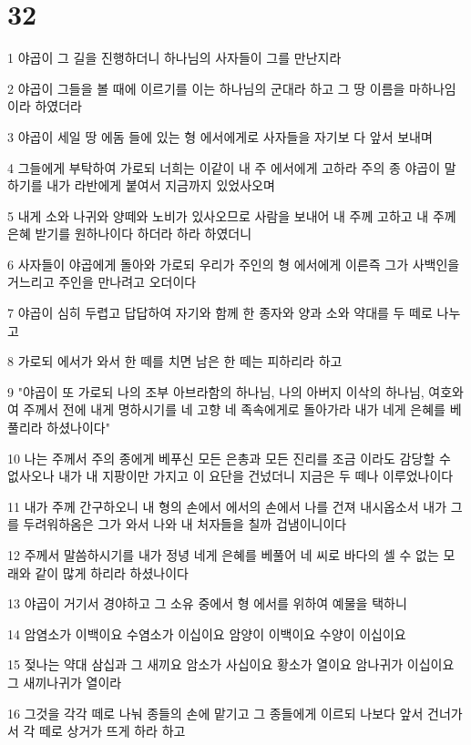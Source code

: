 \chapter{32}

\par 1 야곱이 그 길을 진행하더니 하나님의 사자들이 그를 만난지라
\par 2 야곱이 그들을 볼 때에 이르기를 이는 하나님의 군대라 하고 그 땅 이름을 마하나임이라 하였더라
\par 3 야곱이 세일 땅 에돔 들에 있는 형 에서에게로 사자들을 자기보 다 앞서 보내며
\par 4 그들에게 부탁하여 가로되 너희는 이같이 내 주 에서에게 고하라 주의 종 야곱이 말하기를 내가 라반에게 붙여서 지금까지 있었사오며
\par 5 내게 소와 나귀와 양떼와 노비가 있사오므로 사람을 보내어 내 주께 고하고 내 주께 은혜 받기를 원하나이다 하더라 하라 하였더니
\par 6 사자들이 야곱에게 돌아와 가로되 우리가 주인의 형 에서에게 이른즉 그가 사백인을 거느리고 주인을 만나려고 오더이다
\par 7 야곱이 심히 두렵고 답답하여 자기와 함께 한 종자와 양과 소와 약대를 두 떼로 나누고
\par 8 가로되 에서가 와서 한 떼를 치면 남은 한 떼는 피하리라 하고
\par 9 "야곱이 또 가로되 나의 조부 아브라함의 하나님, 나의 아버지 이삭의 하나님, 여호와여 주께서 전에 내게 명하시기를 네 고향 네 족속에게로 돌아가라 내가 네게 은혜를 베풀리라 하셨나이다"
\par 10 나는 주께서 주의 종에게 베푸신 모든 은총과 모든 진리를 조금 이라도 감당할 수 없사오나 내가 내 지팡이만 가지고 이 요단을 건넜더니 지금은 두 떼나 이루었나이다
\par 11 내가 주께 간구하오니 내 형의 손에서 에서의 손에서 나를 건져 내시옵소서 내가 그를 두려워하옴은 그가 와서 나와 내 처자들을 칠까 겁냄이니이다
\par 12 주께서 말씀하시기를 내가 정녕 네게 은혜를 베풀어 네 씨로 바다의 셀 수 없는 모래와 같이 많게 하리라 하셨나이다
\par 13 야곱이 거기서 경야하고 그 소유 중에서 형 에서를 위하여 예물을 택하니
\par 14 암염소가 이백이요 수염소가 이십이요 암양이 이백이요 수양이 이십이요
\par 15 젖나는 약대 삼십과 그 새끼요 암소가 사십이요 황소가 열이요 암나귀가 이십이요 그 새끼나귀가 열이라
\par 16 그것을 각각 떼로 나눠 종들의 손에 맡기고 그 종들에게 이르되 나보다 앞서 건너가서 각 떼로 상거가 뜨게 하라 하고
